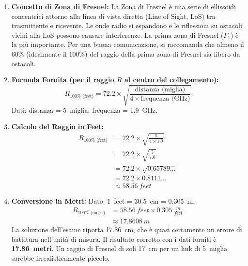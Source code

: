 \begin{enumerate}[label=\textbf{Step \arabic*:}, wide, labelwidth=!, labelindent=0pt]
    \item \textbf{Concetto di Zona di Fresnel:}
    La Zona di Fresnel è una serie di ellissoidi concentrici attorno alla linea di vista diretta (Line of Sight, LoS) tra trasmittente e ricevente. Le onde radio si espandono e le riflessioni su ostacoli vicini alla LoS possono causare interferenze. La prima zona di Fresnel ($F_1$) è la più importante. Per una buona comunicazione, si raccomanda che almeno il 60\% (idealmente il 100\%) del raggio della prima zona di Fresnel sia libero da ostacoli.

    \item \textbf{Formula Fornita (per il raggio $R$ al centro del collegamento):}
    \begin{equation}
        R_{100\% \text{ (feet)}} = 72.2 \times \sqrt{\frac{\text{distanza (miglia)}}{4 \times \text{frequenza (GHz)}}}
    \end{equation}
    Dati: distanza = \SI{5}{miglia}, frequenza = \SI{1.9}{GHz}.

    \item \textbf{Calcolo del Raggio in Feet:}
    \begin{align}
        R_{100\% \text{ (feet)}} &= 72.2 \times \sqrt{\frac{5}{4 \times 1.9}} \\
        &= 72.2 \times \sqrt{\frac{5}{7.6}} \\
        &= 72.2 \times \sqrt{0.65789\dots} \\
        &= 72.2 \times 0.8111\dots \\
        &\approx \SI{58.56}{feet}
    \end{align}

    \item \textbf{Conversione in Metri:}
    Dato: \SI{1}{feet} = \SI{30.5}{cm} = \SI{0.305}{m}.
    \begin{align}
        R_{100\% \text{ (metri)}} &= \SI{58.56}{feet} \times \SI{0.305}{\frac{m}{feet}} \\
        &\approx \SI{17.8608}{m}
    \end{align}
    La soluzione dell'esame riporta \SI{17.86}{cm}, che è quasi certamente un errore di battitura nell'unità di misura. Il risultato corretto con i dati forniti è \textbf{\SI{17.86}{metri}}. Un raggio di Fresnel di soli \SI{17}{cm} per un link di \SI{5}{miglia} sarebbe irrealisticamente piccolo.
\end{enumerate}

